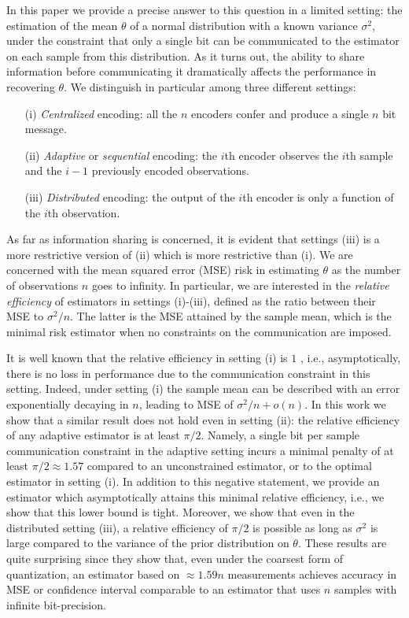 \documentclass[letterpaper, conference]{IEEEtran}      %
\begin{document}
In this paper we provide a precise answer to this question in a limited setting: the estimation of the mean $\theta$ of a normal distribution with a known variance $\sigma^2$, under the constraint that only a single bit can be communicated to the estimator on each sample from this distribution. As it turns out, the ability to share information before communicating it dramatically affects the performance in recovering $\theta$. We distinguish in particular among three different settings:
 \begin{itemize}
 \item[(i)] \emph{Centralized} encoding: all the $n$ encoders confer and produce a single $n$ bit message. 
 \item[(ii)] \emph{Adaptive} or \emph{sequential} encoding: the $i$th encoder observes the $i$th sample and the $i-1$ previously encoded observations.
 \item[(iii)] \emph{Distributed} encoding: the output of the $i$th encoder is only a function of the $i$th observation.
 \end{itemize}
As far as information sharing is concerned, it is evident that settings (iii) is a more restrictive version of (ii) which is more restrictive than (i). We are concerned with the mean squared error (MSE) risk in estimating $\theta$ as the number of observations $n$ goes to infinity. In particular, we are interested in the \emph{relative efficiency} of estimators in settings (i)-(iii), defined as the ratio between their MSE to $\sigma^2/n$. The latter is the MSE attained by the sample mean, which is the minimal risk estimator when no constraints on the communication are imposed. \par
%
It is well known that the relative efficiency in setting (i) is $1$ \cite{720540, zhang2013information, zhang1988estimation}, i.e., asymptotically, there is no loss in performance due to the communication constraint in this setting. Indeed, under setting (i) the sample mean can be described with an error exponentially decaying in $n$, leading to MSE of $\sigma^2/n + o(n)$. In this work we show that a similar result does not hold even in setting (ii): the relative efficiency of any adaptive estimator is at least $\pi/2$. Namely, a single bit per sample communication constraint in the adaptive setting incurs a minimal penalty of at least $\pi/2 \approx 1.57$ compared to an unconstrained estimator, or to the optimal estimator in setting (i). In addition to this negative statement, we provide an estimator which asymptotically attains this minimal relative efficiency, i.e., we show that this lower bound is tight. Moreover, we show that even in the distributed setting (iii), a relative efficiency of $\pi/2$ is possible as long as $\sigma^2$ is large compared to the variance of the prior distribution on $\theta$. These results are quite surprising since they show that, even under the coarsest form of quantization, an estimator based on $ \approx 1.59 n$ measurements achieves accuracy in MSE or confidence interval comparable to an estimator that uses $n$ samples with infinite bit-precision.  \par
\end{document}

